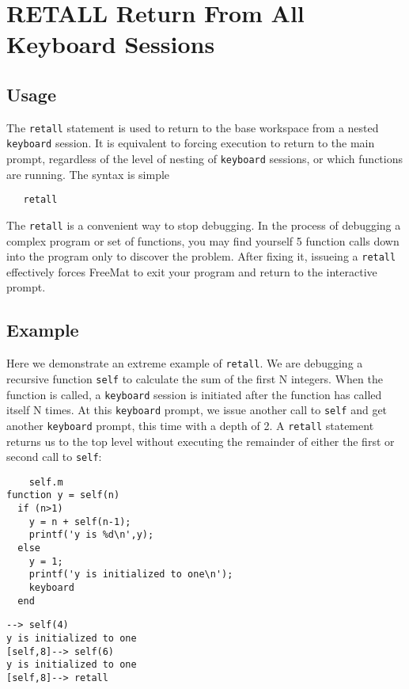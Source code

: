 \section{RETALL Return From All Keyboard Sessions}

\subsection{Usage}

The \verb|retall| statement is used to return to the base workspace
from a nested \verb|keyboard| session.  It is equivalent to forcing
execution to return to the main prompt, regardless of the level
of nesting of \verb|keyboard| sessions, or which functions are
running.  The syntax is simple
\begin{verbatim}
   retall
\end{verbatim}
The \verb|retall| is a convenient way to stop debugging.  In the
process of debugging a complex program or set of functions,
you may find yourself 5 function calls down into the program
only to discover the problem.  After fixing it, issueing
a \verb|retall| effectively forces FreeMat to exit your program
and return to the interactive prompt.
\subsection{Example}

Here we demonstrate an extreme example of \verb|retall|.  We
are debugging a recursive function \verb|self| to calculate the sum
of the first N integers.  When the function is called,
a \verb|keyboard| session is initiated after the function
has called itself N times.  At this \verb|keyboard| prompt,
we issue another call to \verb|self| and get another \verb|keyboard|
prompt, this time with a depth of 2.  A \verb|retall| statement
returns us to the top level without executing the remainder
of either the first or second call to \verb|self|:
\begin{verbatim}
    self.m
function y = self(n)
  if (n>1)
    y = n + self(n-1);
    printf('y is %d\n',y);
  else
    y = 1;
    printf('y is initialized to one\n');
    keyboard
  end
\end{verbatim}
\begin{verbatim}
--> self(4)
y is initialized to one
[self,8]--> self(6)
y is initialized to one
[self,8]--> retall
\end{verbatim}
